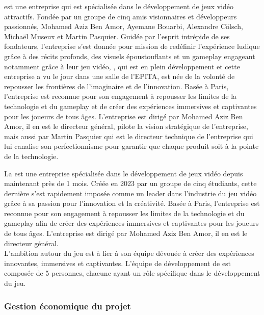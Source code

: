 \companyName est une entreprise qui est spécialisée dans le développement de jeux vidéo attractifs. 
Fondée par un groupe de cinq amis visionnaires et développeurs passionnés, Mohamed Aziz Ben Amor, Ayemane Bouarbi, Alexandre Cölsch, Michaël Museux et Martin Pasquier.
Guidée par l'esprit intrépide de ses fondateurs, l'entreprise s'est donnée pour mission de redéfinir l'expérience ludique grâce à des récits profonds, des visuels époustouflants et un gameplay engageant notamment grâce à leur jeu vidéo, \gameName, qui est en plein développement et cette entreprise a vu le jour dans une salle de l'EPITA, \companyName est née de la volonté de repousser les frontières de l'imaginaire et de l'innovation.
Basée à Paris, l'entreprise est reconnue pour son engagement à repousser les limites de la technologie et du gameplay et de créer des expériences immersives et captivantes pour les joueurs de tous âges. 
L'entreprise est dirigé par Mohamed Aziz Ben Amor, il en est le directeur général, pilote la vision stratégique de l'entreprise, mais aussi par Martin Pasquier qui est le directeur technique de l’entreprise qui lui canalise son perfectionnisme pour garantir que chaque produit soit à la pointe de la technologie.




La \textit{\companyName} est une entreprise spécialisée dans le développement de jeux vidéo depuis maintenant pr\`es de 1 mois.
Créée en 2023 par un groupe de cinq \'etudiants, cette derni\`ere s'est rapidement impos\'ee comme un leader dans l'industrie du jeu vidéo gr\^ace \`a sa passion pour l'innovation et la cr\'eativité. 
Basée à Paris, l'entreprise est reconnue pour son engagement à repousser les limites de la technologie et du gameplay afin de créer des expériences immersives et captivantes pour les joueurs de tous âges.
L'entreprise est dirig\'e par Mohamed Aziz Ben Amor, il en est le directeur général. 
\\

L'ambition autour du jeu \textit{\gameName} est \`a lier \`a son \'equipe d\'evou\'ee \`a cr\'eer des exp\'eriences innovantes, immersives et captivantes. 
L'équipe de développement de \textit{\gameName} est composée de 5 personnes, chacune ayant un rôle spécifique dans le développement du jeu.
\\

\subsubsection*{Gestion \'economique du projet}


